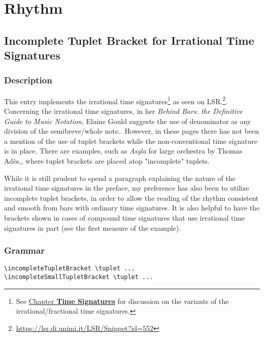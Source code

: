 
\chapter {Rhythm}
\label{sec:incompleteTuplet}

\section {Incomplete Tuplet Bracket for Irrational Time Signatures}

\subsection{Description}

This entry implements the irrational time signatures\footnote{See \hyperref[sec:time_signatures]{Chapter \textbf{Time Signatures}} for discussion on the variants of the irrational/fractional time signatures.} as seen on LSR.\footnote{\url{https://lsr.di.unimi.it/LSR/Snippet?id=552}}. Concerning the irrational time signatures, in her \textit{Behind Bars: the Definitive Guide to Music Notation}, Elaine Gould suggests the use of denominator as any division of the semibreve/whole note.\autocite[180-181]{RN1741}. However, in these pages there has not been a mention of the use of tuplet brackets while the non-conventional time signature is in place. There are examples, such as \textit{Asyla} for large orchestra by Thomas Adès,\autocite{RN1742}, where tuplet brackets are placed atop "incomplete" tuplets. 

While it is still prudent to spend a paragraph explaining the nature of the irrational time signatures in the preface, my preference has also been to utilize incomplete tuplet brackets, in order to allow the reading of the rhythm consistent and smooth from bars with ordinary time signatures. It is also helpful to have the brackets shown in cases of compound time signatures that use irrational time signatures in part (see the first measure of the example).

\subsection{Grammar}
\begin{verbatim}
\incompleteTupletBracket \tuplet ...
\incompleteSmallTupletBracket \tuplet ... 
\end{verbatim}


